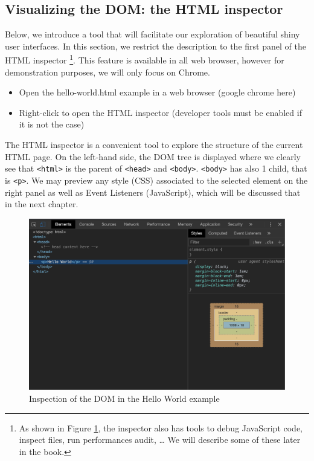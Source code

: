 \documentclass[]{book}
\providecommand{\tightlist}{%
  \setlength{\itemsep}{0pt}\setlength{\parskip}{0pt}}
\begin{document}
\hypertarget{visualizing-the-dom-the-html-inspector}{%
\subsection{Visualizing the DOM: the HTML inspector}\label{visualizing-the-dom-the-html-inspector}}

Below, we introduce a tool that will facilitate our exploration of beautiful shiny user interfaces. In this section, we restrict the description to the first panel of the HTML inspector \footnote{As shown in Figure \ref{fig:html-dom}, the inspector also has tools to debug JavaScript code, inspect files, run performances audit, \ldots{} We will describe some of these later in the book.}. This feature is available in all web browser, however for demonstration purposes, we will only focus on Chrome.

\begin{itemize}
\tightlist
\item
  Open the hello-world.html example in a web browser (google chrome here)
\item
  Right-click to open the HTML inspector (developer tools must be enabled if it is not the case)
\end{itemize}

The HTML inspector is a convenient tool to explore the structure of the current HTML page. On the left-hand side, the DOM tree is displayed where we clearly see that \texttt{\textless{}html\textgreater{}} is the parent of \texttt{\textless{}head\textgreater{}} and \texttt{\textless{}body\textgreater{}}. \texttt{\textless{}body\textgreater{}} has also 1 child, that is \texttt{\textless{}p\textgreater{}}. We may preview any style (CSS) associated to the selected element on the right panel as well as Event Listeners (JavaScript), which will be discussed that in the next chapter.

\begin{figure}
\includegraphics[width=21.5in]{images/survival-kit/dom} \caption{Inspection of the DOM in the Hello World example}\label{fig:html-dom}
\end{figure}
\end{document}

